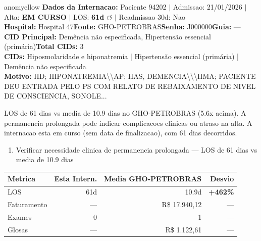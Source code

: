 \documentclass[a4paper,10pt]{article}
\begin{document}
\begin{anomalycard}[Internacao 162805 | GHO-PETROBRAS | MODERADO (z=2.45)]{anomyellow}
\textbf{Dados da Internacao:} Paciente 94202 $\mid$ Admissao: 21/01/2026 $\mid$ Alta: \textcolor{anomorange}{\textbf{EM CURSO}} $\mid$ LOS: \textbf{61d \textcolor{anomorange}{$\circlearrowleft$}} $\mid$ Readmissao 30d: Nao\\
\textbf{Hospital:} Hospital 47\quad\textbf{Fonte:} GHO-PETROBRAS\quad\textbf{Senha:} J000000\quad\textbf{Guia:} ---\\
\textbf{CID Principal:} {\small Demência não especificada, Hipertensão essencial (primária)}\quad\textbf{Total CIDs:} 3\\

\textbf{CIDs:} {\scriptsize Hiposmolaridade e hiponatremia | Hipertensão essencial (primária) | Demência não especificada}\\

\textbf{Motivo:} {\scriptsize HD; HIPONATREMIA\textbackslash{}\textbackslash{}AP; HAS, DEMENCIA\textbackslash{}\textbackslash{}\textbackslash{}HMA; PACIENTE DEU ENTRADA PELO PS COM RELATO DE REBAIXAMENTO DE NIVEL DE CONSCIENCIA, SONOLE...}\\

\vspace{2pt}\begin{tcolorbox}[colback=severityred!20,colframe=anomyellow,title={\textbf{Interpretacao de Negocio}},fonttitle=\bfseries\small,left=4pt,right=4pt,top=3pt,bottom=3pt]
{\small LOS de 61 dias vs media de 10.9 dias no GHO-PETROBRAS (5.6x acima). A permanencia prolongada pode indicar complicacoes clinicas ou atraso na alta. A internacao esta em curso (sem data de finalizacao), com 61 dias decorridos.}
\end{tcolorbox}
\begin{tcolorbox}[colback=severityyellow!30,colframe=anomorange,title={\textbf{Recomendacoes Especificas}},fonttitle=\bfseries\small,left=4pt,right=4pt,top=3pt,bottom=3pt]
\begin{enumerate}[nosep,leftmargin=16pt]
\item {\small Verificar necessidade clinica de permanencia prolongada --- LOS de 61 dias vs media de 10.9 dias}
\end{enumerate}
\end{tcolorbox}
\begin{center}\begin{tabular}{l r r r}\toprule\textbf{Metrica} & \textbf{Esta Intern.} & \textbf{Media GHO-PETROBRAS} & \textbf{Desvio} \\\midrule
LOS & 61d & 10.9d & \textcolor{anomred}{\textbf{+462\%}} \\
Faturamento & --- & R\$ 17.940,12 & --- \\
Exames & 0 & 1 & --- \\
Glosas & --- & R\$ 1.122,61 & --- \\
\bottomrule\end{tabular}\end{center}


\end{anomalycard}
\end{document}

